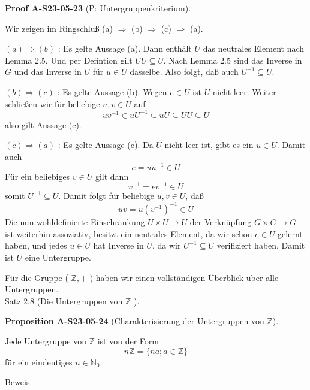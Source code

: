 \documentclass[10pt, letterpaper]{article}
\newcommand{\CustomHeading}[3]{%
  \par\medskip\noindent%
  \textbf{#1 #2} \textnormal{(#3)}.\enskip%
}
\newenvironment{PROP}[2]{\begin{unitbox}\CustomHeading{Proposition}{#1}{#2}}{\end{unitbox}}
\newenvironment{PROOF}[2]{\begin{unitbox}\CustomHeading{Proof}{#1}{#2}}{\end{unitbox}}
\begin{document}
\begin{PROOF}{A-S23-05-23}{P: Untergruppenkriterium}
Wir zeigen im Ringschluß (a) $\Longrightarrow$ (b) $\Longrightarrow$ (c) $\Longrightarrow$ (a).


$(a) \Longrightarrow(b)$ : Es gelte Aussage (a). Dann enthält $U$ das neutrales Element nach Lemma 2.5. Und per Defintion gilt $U U \subseteq U$. Nach Lemma 2.5 sind das Inverse in $G$ und das Inverse in $U$ für $u \in U$ dasselbe. Also folgt, daß auch $U^{-1} \subseteq U$.

$(b) \Longrightarrow(c)$ : Es gelte Aussage (b). Wegen $e \in U$ ist $U$ nicht leer. Weiter schließen wir für beliebige $u, v \in U$ auf
$$
u v^{-1} \in u U^{-1} \subseteq u U \subseteq U U \subseteq U
$$
also gilt Aussage (c).


$(c) \Longrightarrow(a)$ : Es gelte Aussage (c). Da $U$ nicht leer ist, gibt es ein $u \in U$. Damit auch
$$
e=u u^{-1} \in U
$$
Für ein beliebiges $v \in U$ gilt dann
$$
v^{-1}=e v^{-1} \in U
$$
somit $U^{-1} \subseteq U$. Damit folgt für beliebige $u, v \in U$, daß
$$
u v=u\left(v^{-1}\right)^{-1} \in U
$$
Die nun wohldefinierte Einschränkung $U \times U \rightarrow U$ der Verknüpfung $G \times G \rightarrow G$ ist weiterhin assoziativ, besitzt ein neutrales Element, da wir schon $e \in U$ gelernt haben, und jedes $u \in U$ hat Inverse in $U$, da wir $U^{-1} \subseteq U$ verifiziert haben. Damit ist $U$ eine Untergruppe.
\end{PROOF}


Für die Gruppe ( $\mathbb{Z},+$ ) haben wir einen vollständigen Überblick über alle Untergruppen.\\


Satz 2.8 (Die Untergruppen von $\mathbb{Z}$ ). 

\begin{PROP}{A-S23-05-24}{Charakterisierung der Untergruppen von $\mathbb{Z}$}
Jede Untergruppe von $\mathbb{Z}$ ist von der Form
$$
n \mathbb{Z}=\{n a ; a \in \mathbb{Z}\}
$$
für ein eindeutiges $n \in \mathbb{N}_{0}$.
\end{PROP}


Beweis. 
\end{document}
